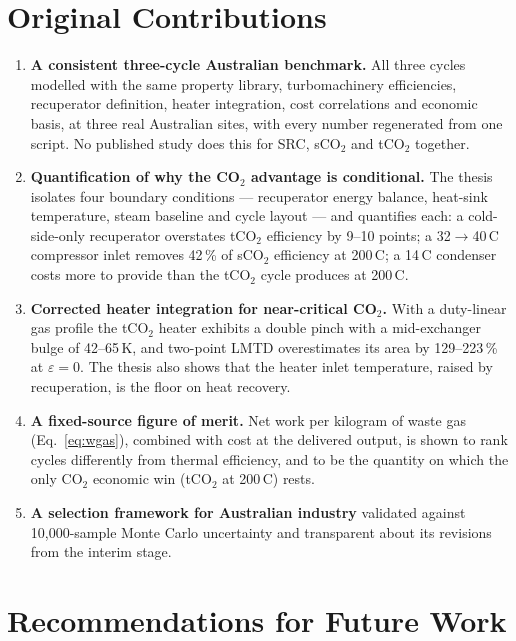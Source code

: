 \section{Original Contributions}
\label{sec:contributions}

\begin{enumerate}[leftmargin=1.8em,itemsep=5pt]
\item \textbf{A consistent three-cycle Australian benchmark.} All three
cycles modelled with the same property library, turbomachinery efficiencies,
recuperator definition, heater integration, cost correlations and economic
basis, at three real Australian sites, with every number regenerated from one
script. No published study does this for SRC, sCO$_2$ and tCO$_2$ together.
\item \textbf{Quantification of why the CO$_2$ advantage is
conditional.} The thesis isolates four boundary conditions --- recuperator
energy balance, heat-sink temperature, steam baseline and cycle layout ---
and quantifies each: a cold-side-only recuperator overstates tCO$_2$
efficiency by 9--10 points; a 32$\to$40\,\textdegree C compressor inlet
removes 42\,\% of sCO$_2$ efficiency at 200\,\textdegree C; a 14\,\textdegree C
condenser costs more to provide than the tCO$_2$ cycle produces at
200\,\textdegree C.
\item \textbf{Corrected heater integration for near-critical CO$_2$.} With
a duty-linear gas profile the tCO$_2$ heater exhibits a double pinch with a
mid-exchanger bulge of 42--65\,K, and two-point LMTD overestimates its area
by 129--223\,\% at $\varepsilon = 0$. The thesis also shows that the heater
inlet temperature, raised by recuperation, is the floor on heat recovery.
\item \textbf{A fixed-source figure of merit.} Net work per kilogram of
waste gas (Eq.~\ref{eq:wgas}), combined with cost at the delivered output,
is shown to rank cycles differently from thermal efficiency, and to be the
quantity on which the only CO$_2$ economic win (tCO$_2$ at
200\,\textdegree C) rests.
\item \textbf{A selection framework for Australian industry} validated
against 10,000-sample Monte Carlo uncertainty and transparent about its
revisions from the interim stage.
\end{enumerate}

\section{Recommendations for Future Work}
\label{sec:future_work}

